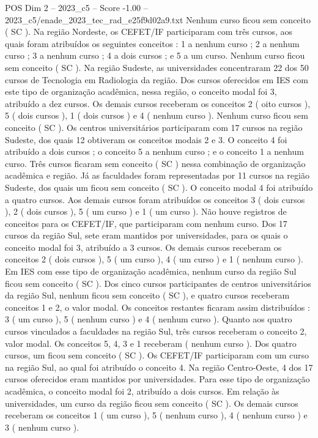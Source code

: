 \begin{textsample}{POS Dim 2 – 2023\_c5 – Score -1.00 – 2023\_c5/enade\_2023\_tec\_rad\_e25f9d02a9.txt}
Nenhum curso ficou sem conceito ( SC ).
Na região Nordeste, os CEFET/IF participaram com três cursos, aos quais foram atribuídos os seguintes conceitos : 1 a nenhum curso ; 2 a nenhum curso ; 3 a nenhum curso ; 4 a dois cursos ; e 5 a um curso.
Nenhum curso ficou sem conceito ( SC ).
Na região Sudeste, as universidades concentraram 22 dos 50 cursos de Tecnologia em Radiologia da região.
Dos cursos oferecidos em IES com este tipo de organização acadêmica, nessa região, o conceito modal foi 3, atribuído a dez cursos.
Os demais cursos receberam os conceitos 2 ( oito cursos ), 5 ( dois cursos ), 1 ( dois cursos ) e 4 ( nenhum curso ).
Nenhum curso ficou sem conceito ( SC ).
Os centros universitários participaram com 17 cursos na região Sudeste, dos quais 12 obtiveram os conceitos modais 2 e 3.
O conceito 4 foi atribuído a dois cursos ; o conceito 5 a nenhum curso ; e o conceito 1 a nenhum curso.
Três cursos ficaram sem conceito ( SC ) nessa combinação de organização acadêmica e região.
Já as faculdades foram representadas por 11 cursos na região Sudeste, dos quais um ficou sem conceito ( SC ).
O conceito modal 4 foi atribuído a quatro cursos.
Aos demais cursos foram atribuídos os conceitos 3 ( dois cursos ), 2 ( dois cursos ), 5 ( um curso ) e 1 ( um curso ).
Não houve registros de conceitos para os CEFET/IF, que participaram com nenhum curso.
Dos 17 cursos da região Sul, sete eram mantidos por universidades, para os quais o conceito modal foi 3, atribuído a 3 cursos.
Os demais cursos receberam os conceitos 2 ( dois cursos ), 5 ( um curso ), 4 ( um curso ) e 1 ( nenhum curso ).
Em IES com esse tipo de organização acadêmica, nenhum curso da região Sul ficou sem conceito ( SC ).
Dos cinco cursos participantes de centros universitários da região Sul, nenhum ficou sem conceito ( SC ), e quatro cursos receberam conceitos 1 e 2, o valor modal.
Os conceitos restantes ficaram assim distribuídos : 3 ( um curso ), 5 ( nenhum curso ) e 4 ( nenhum curso ).
Quanto aos quatro cursos vinculados a faculdades na região Sul, três cursos receberam o conceito 2, valor modal.
Os conceitos 5, 4, 3 e 1 receberam ( nenhum curso ).
Dos quatro cursos, um ficou sem conceito ( SC ).
Os CEFET/IF participaram com um curso na região Sul, ao qual foi atribuído o conceito 4.
Na região Centro-Oeste, 4 dos 17 cursos oferecidos eram mantidos por universidades.
Para esse tipo de organização acadêmica, o conceito modal foi 2, atribuído a dois cursos.
Em relação às universidades, um curso da região ficou sem conceito ( SC ).
Os demais cursos receberam os conceitos 1 ( um curso ), 5 ( nenhum curso ), 4 ( nenhum curso ) e 3 ( nenhum curso ).

\end{textsample}
